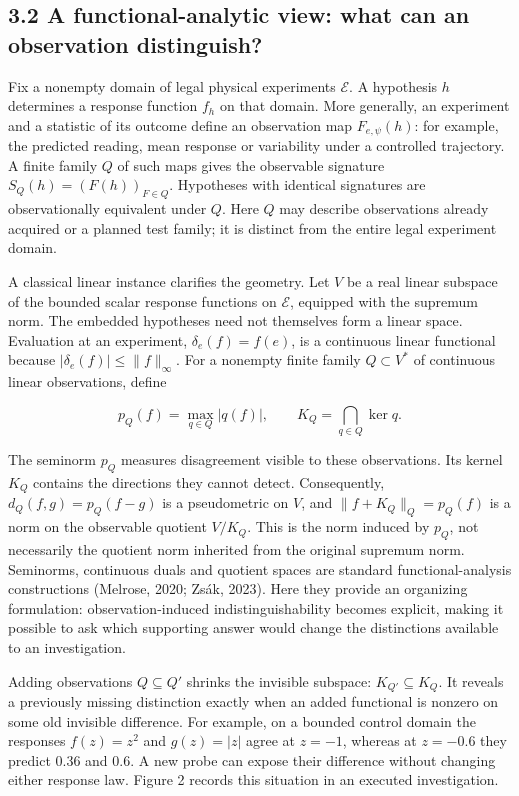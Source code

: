 \documentclass[twoside,11pt]{article}
\begin{document}
\subsection*{3.2 A functional-analytic view: what can an observation distinguish?}

Fix a nonempty domain of legal physical experiments \(\mathcal E\). A hypothesis \(h\) determines a response function \(f_h\) on that domain. More generally, an experiment and a statistic of its outcome define an observation map \(F_{e,\psi}(h)\): for example, the predicted reading, mean response or variability under a controlled trajectory. A finite family \(Q\) of such maps gives the observable signature \(S_Q(h)=(F(h))_{F\in Q}\). Hypotheses with identical signatures are observationally equivalent under \(Q\). Here \(Q\) may describe observations already acquired or a planned test family; it is distinct from the entire legal experiment domain.


A classical linear instance clarifies the geometry. Let \(V\) be a real linear subspace of the bounded scalar response functions on \(\mathcal E\), equipped with the supremum norm. The embedded hypotheses need not themselves form a linear space. Evaluation at an experiment, \(\delta_e(f)=f(e)\), is a continuous linear functional because \(|\delta_e(f)|\leq\|f\|_\infty\). For a nonempty finite family \(Q\subset V^*\) of continuous linear observations, define


\[
p_Q(f)=\max_{q\in Q}|q(f)|,\qquad
K_Q=\bigcap_{q\in Q}\ker q.
\]


The seminorm \(p_Q\) measures disagreement visible to these observations. Its kernel \(K_Q\) contains the directions they cannot detect. Consequently, \(d_Q(f,g)=p_Q(f-g)\) is a pseudometric on \(V\), and \(\|f+K_Q\|_Q=p_Q(f)\) is a norm on the observable quotient \(V/K_Q\). This is the norm induced by \(p_Q\), not necessarily the quotient norm inherited from the original supremum norm. Seminorms, continuous duals and quotient spaces are standard functional-analysis constructions (Melrose, 2020; Zsák, 2023). Here they provide an organizing formulation: observation-induced indistinguishability becomes explicit, making it possible to ask which supporting answer would change the distinctions available to an investigation.


Adding observations \(Q\subseteq Q'\) shrinks the invisible subspace: \(K_{Q'}\subseteq K_Q\). It reveals a previously missing distinction exactly when an added functional is nonzero on some old invisible difference. For example, on a bounded control domain the responses \(f(z)=z^2\) and \(g(z)=|z|\) agree at \(z=-1\), whereas at \(z=-0.6\) they predict \(0.36\) and \(0.6\). A new probe can expose their difference without changing either response law. Figure 2 records this situation in an executed investigation.
\end{document}

